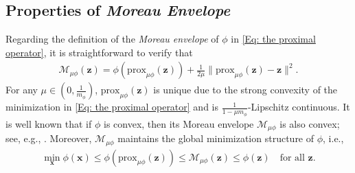\documentclass{article}
\theoremstyle{plain}
\theoremstyle{definition}
\theoremstyle{remark}
\newcommand{\prox}{\mathrm{prox}}
\newcommand{\bx}{\bm{x}}
\newcommand{\bz}{\bm{z}}
\newcommand{\calM}{\mathcal{M}}
\numberwithin{equation}{section}
\begin{document}
\subsection{Properties of \textit{Moreau Envelope}}
\label{app:moreau_properties}
Regarding the definition of the \textit{Moreau envelope} of \(\phi\) in \eqref{Eq: the proximal operator}, it is straightforward to verify that
\begin{align*}
\calM_{\mu\phi}(\bz)= \phi(\prox_{\mu \phi}(\bz)) + \frac{1}{2\mu} \|\prox_{\mu \phi}(\bz)- \bz\|^2.
\end{align*}
For any \(\mu \in(0, \frac{1}{m_{\phi}})\), \(\prox_{\mu \phi}(\bz)\) is unique due to the strong convexity of the minimization in \eqref{Eq: the proximal operator} and is $\frac{1}{1 - \mu m_{\phi}}$-Lipschitz continuous. It is well known that if $\phi$ is convex, then its Moreau envelope $\calM_{\mu\phi}$ is also convex; see, e.g., \citep[Theorem~2.26]{rockafellar2009variational}. Moreover, $\calM_{\mu \phi}$ maintains the global minimization structure of $\phi$, i.e.,
\begin{align}
   \min_{\bx} \phi(\bx) \leq \phi(\prox_{\mu \phi}(\bz)) \leq \calM_{\mu \phi}(\bz) \leq \phi(\bz) \quad \text{for all } \bz.
   \label{Eq: global bound}
\end{align}
\end{document}
